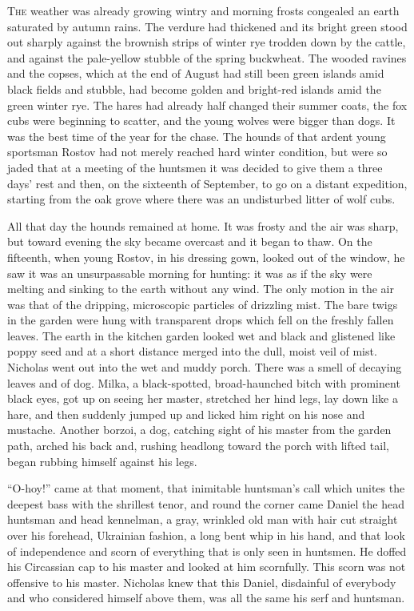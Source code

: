 \lettrine[lines=2, loversize=0.3, lraise=0]{\initfamily T}{he}
weather was already growing wintry and morning frosts
congealed an earth saturated by autumn rains. The verdure had
thickened and its bright green stood out sharply against the
brownish strips of winter rye trodden down by the cattle, and
against the pale-yellow stubble of the spring buckwheat. The
wooded ravines and the copses, which at the end of August had
still been green islands amid black fields and stubble, had
become golden and bright-red islands amid the green winter
rye. The hares had already half changed their summer coats, the
fox cubs were beginning to scatter, and the young wolves were
bigger than dogs. It was the best time of the year for the
chase. The hounds of that ardent young sportsman Rostov had not
merely reached hard winter condition, but were so jaded that at a
meeting of the huntsmen it was decided to give them a three days'
rest and then, on the sixteenth of September, to go on a distant
expedition, starting from the oak grove where there was an
undisturbed litter of wolf cubs.

All that day the hounds remained at home. It was frosty and the
air was sharp, but toward evening the sky became overcast and it
began to thaw.  On the fifteenth, when young Rostov, in his
dressing gown, looked out of the window, he saw it was an
unsurpassable morning for hunting: it was as if the sky were
melting and sinking to the earth without any wind.  The only
motion in the air was that of the dripping, microscopic particles
of drizzling mist. The bare twigs in the garden were hung with
transparent drops which fell on the freshly fallen leaves. The
earth in the kitchen garden looked wet and black and glistened
like poppy seed and at a short distance merged into the dull,
moist veil of mist.  Nicholas went out into the wet and muddy
porch. There was a smell of decaying leaves and of dog. Milka, a
black-spotted, broad-haunched bitch with prominent black eyes,
got up on seeing her master, stretched her hind legs, lay down
like a hare, and then suddenly jumped up and licked him right on
his nose and mustache. Another borzoi, a dog, catching sight of
his master from the garden path, arched his back and, rushing
headlong toward the porch with lifted tail, began rubbing himself
against his legs.

``O-hoy!'' came at that moment, that inimitable huntsman's call
which unites the deepest bass with the shrillest tenor, and round
the corner came Daniel the head huntsman and head kennelman, a
gray, wrinkled old man with hair cut straight over his forehead,
Ukrainian fashion, a long bent whip in his hand, and that look of
independence and scorn of everything that is only seen in
huntsmen. He doffed his Circassian cap to his master and looked
at him scornfully. This scorn was not offensive to his
master. Nicholas knew that this Daniel, disdainful of everybody
and who considered himself above them, was all the same his serf
and huntsman.


